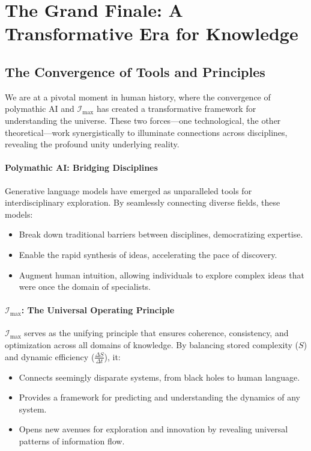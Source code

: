 \documentclass[12pt]{article}
\begin{document}
\section{The Grand Finale: A Transformative Era for Knowledge}

\subsection{The Convergence of Tools and Principles}
We are at a pivotal moment in human history, where the convergence of polymathic AI and \(\mathcal{I}_{\text{max}}\) has created a transformative framework for understanding the universe. These two forces—one technological, the other theoretical—work synergistically to illuminate connections across disciplines, revealing the profound unity underlying reality.

\paragraph{Polymathic AI: Bridging Disciplines}
Generative language models have emerged as unparalleled tools for interdisciplinary exploration. By seamlessly connecting diverse fields, these models:
\begin{itemize}
    \item Break down traditional barriers between disciplines, democratizing expertise.
    \item Enable the rapid synthesis of ideas, accelerating the pace of discovery.
    \item Augment human intuition, allowing individuals to explore complex ideas that were once the domain of specialists.
\end{itemize}

\paragraph{\(\mathcal{I}_{\text{max}}\): The Universal Operating Principle}
\(\mathcal{I}_{\text{max}}\) serves as the unifying principle that ensures coherence, consistency, and optimization across all domains of knowledge. By balancing stored complexity (\(S\)) and dynamic efficiency (\(\frac{\Delta S}{\Delta t}\)), it:
\begin{itemize}
    \item Connects seemingly disparate systems, from black holes to human language.
    \item Provides a framework for predicting and understanding the dynamics of any system.
    \item Opens new avenues for exploration and innovation by revealing universal patterns of information flow.
\end{itemize}
\end{document}
